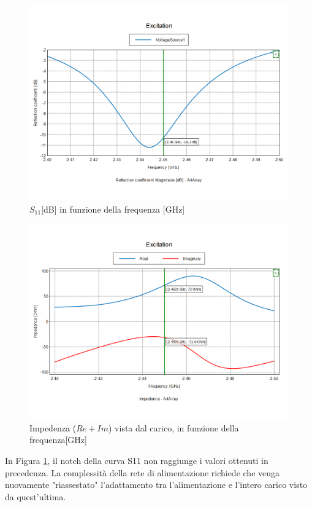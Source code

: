 \documentclass[twoside,twocolumn]{article}
\begin{document}
\begin{figure}[h!]
  \includegraphics[width=\linewidth]{Array4E_S11.png}
  \caption{$S_{11} $[dB] in funzione della frequenza [GHz]}
  \label{fig:Array4E_S11}
\end{figure}
\begin{figure}[h]
  \includegraphics[width=\linewidth]{Array4E_impedenza.png}
  \caption{Impedenza ($Re +Im$) vista dal carico, in funzione della frequenza[GHz]}
  \label{fig:Array4E_impedenza}
\end{figure}
In Figura \ref{fig:Array4E_S11}, il notch della curva S11 non raggiunge i valori ottenuti in precedenza. \newline
La complessità della rete di alimentazione richiede che venga  nuovamente "riassestato" l'adattamento tra l'alimentazione e l'intero carico visto da quest'ultima.
\end{document}
